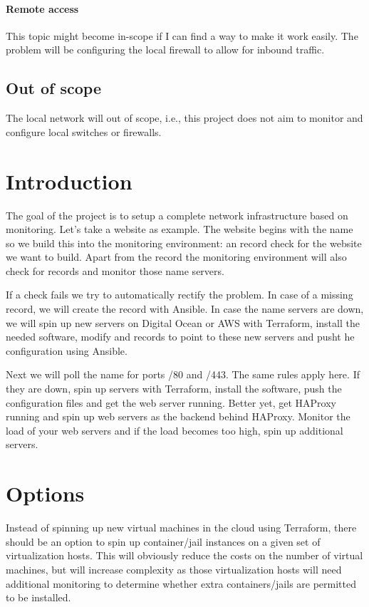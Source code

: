 \documentclass[a4paper,12pt]{scrartcl}
\begin{document}
\paragraph{Remote access }
This topic might become in-scope if I can find a way to make it work easily.
The problem will be configuring the local firewall to allow for inbound traffic.


\subsection{Out of scope}
The local network will out of scope, i.e., this project does not aim to monitor and configure local switches or firewalls.









\section{Introduction}
The goal of the  project is to setup a complete network infrastructure based on monitoring.
Let's take a website as example.
The website begins with the  name so we build this into the monitoring environment: an  record check for the website we want to build.
Apart from the  record the monitoring environment will also check for  records and monitor those name servers.

If a check fails we try to automatically rectify the problem.
In case of a missing  record, we will create the record with Ansible.
In case the name servers are down, we will spin up new servers on Digital Ocean or AWS with Terraform, install the needed software, modify  and  records to point to these new servers and pusht he  configuration using Ansible.

Next we will poll the  name for ports /80 and /443.
The same rules apply here.
If they are down, spin up servers with Terraform, install the software, push the configuration files and get the web server running.
Better yet, get HAProxy running and spin up web servers as the backend behind HAProxy.
Monitor the load of your web servers and if the load becomes too high, spin up additional servers.



\section{Options}
Instead of spinning up new virtual machines in the cloud using Terraform, there should be an option to spin up container/jail instances on a given set of virtualization hosts.
This will obviously reduce the costs on the number of virtual machines, but will increase complexity as those virtualization hosts will need additional monitoring to determine whether extra containers/jails are permitted to be installed.
\end{document}

